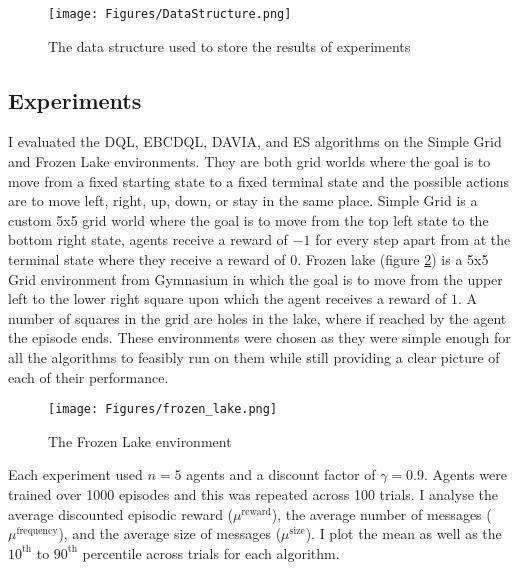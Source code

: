 \begin{figure}[H]
    \centering
    \texttt{[image: Figures/DataStructure.png]}
    \caption{The data structure used to store the results of experiments}
    \label{fig:DataStructure}
\end{figure}

\subsection{Experiments}
I evaluated the DQL, EBCDQL, DAVIA, and ES algorithms on the Simple Grid and Frozen Lake environments. They are both grid worlds where the goal is to move from a fixed starting state to a fixed terminal state and the possible actions are to move left, right, up, down, or stay in the same place. Simple Grid is a custom 5x5 grid world where the goal is to move from the top left state to the bottom right state, agents receive a reward of $-1$ for every step apart from at the terminal state where they receive a reward of $0$. Frozen lake (figure \ref{fig:FrozenLake}) is a 5x5 Grid environment from Gymnasium in which the goal is to move from the upper left to the lower right square upon which the agent receives a reward of $1$. A number of squares in the grid are holes in the lake, where if reached by the agent the episode ends. These environments were chosen as they were simple enough for all the algorithms to feasibly run on them while still providing a clear picture of each of their performance.

\begin{figure}
    \centering
    \texttt{[image: Figures/frozen\_lake.png]}
    \caption{The Frozen Lake environment}
    \label{fig:FrozenLake}
\end{figure}

Each experiment used $n=5$ agents and a discount factor of $\gamma=0.9$. Agents were trained over 1000 episodes and this was repeated across 100 trials. I analyse the average discounted episodic reward ($\mu^{\text{reward}}$), the average number of messages ($\mu^{\text{frequency}}$), and the average size of messages ($\mu^{\text{size}}$). I plot the mean as well as the $10^{\text{th}}$ to $90^{\text{th}}$ percentile across trials for each algorithm.

